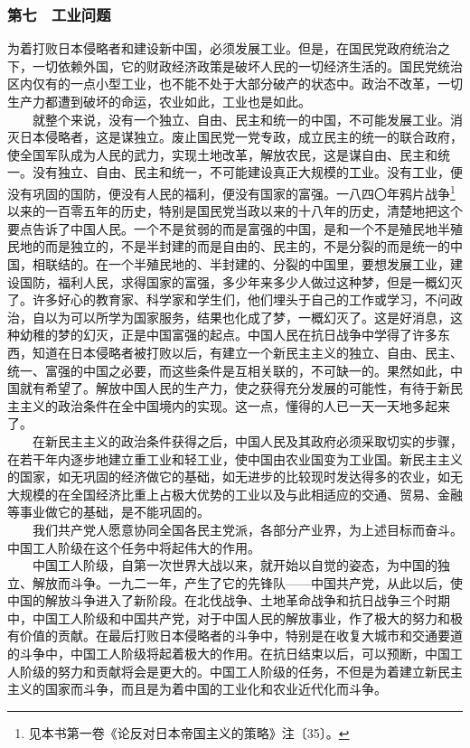 \documentclass[cn,11pt,chinese]{elegantbook}
\def\myformat#1{\hfil\hfil #1}
\begin{document}
\subsubsection*{\myformat{第七　工业问题}}
为着打败日本侵略者和建设新中国，必须发展工业。但是，在国民党政府统治之下，一切依赖外国，它的财政经济政策是破坏人民的一切经济生活的。国民党统治区内仅有的一点小型工业，也不能不处于大部分破产的状态中。政治不改革，一切生产力都遭到破坏的命运，农业如此，工业也是如此。\\
　　就整个来说，没有一个独立、自由、民主和统一的中国，不可能发展工业。消灭日本侵略者，这是谋独立。废止国民党一党专政，成立民主的统一的联合政府，使全国军队成为人民的武力，实现土地改革，解放农民，这是谋自由、民主和统一。没有独立、自由、民主和统一，不可能建设真正大规模的工业。没有工业，便没有巩固的国防，便没有人民的福利，便没有国家的富强。一八四〇年鸦片战争\footnote[21]{  见本书第一卷《论反对日本帝国主义的策略》注〔35〕。}以来的一百零五年的历史，特别是国民党当政以来的十八年的历史，清楚地把这个要点告诉了中国人民。一个不是贫弱的而是富强的中国，是和一个不是殖民地半殖民地的而是独立的，不是半封建的而是自由的、民主的，不是分裂的而是统一的中国，相联结的。在一个半殖民地的、半封建的、分裂的中国里，要想发展工业，建设国防，福利人民，求得国家的富强，多少年来多少人做过这种梦，但是一概幻灭了。许多好心的教育家、科学家和学生们，他们埋头于自己的工作或学习，不问政治，自以为可以所学为国家服务，结果也化成了梦，一概幻灭了。这是好消息，这种幼稚的梦的幻灭，正是中国富强的起点。中国人民在抗日战争中学得了许多东西，知道在日本侵略者被打败以后，有建立一个新民主主义的独立、自由、民主、统一、富强的中国之必要，而这些条件是互相关联的，不可缺一的。果然如此，中国就有希望了。解放中国人民的生产力，使之获得充分发展的可能性，有待于新民主主义的政治条件在全中国境内的实现。这一点，懂得的人已一天一天地多起来了。\\
　　在新民主主义的政治条件获得之后，中国人民及其政府必须采取切实的步骤，在若干年内逐步地建立重工业和轻工业，使中国由农业国变为工业国。新民主主义的国家，如无巩固的经济做它的基础，如无进步的比较现时发达得多的农业，如无大规模的在全国经济比重上占极大优势的工业以及与此相适应的交通、贸易、金融等事业做它的基础，是不能巩固的。\\
　　我们共产党人愿意协同全国各民主党派，各部分产业界，为上述目标而奋斗。中国工人阶级在这个任务中将起伟大的作用。\\
　　中国工人阶级，自第一次世界大战以来，就开始以自觉的姿态，为中国的独立、解放而斗争。一九二一年，产生了它的先锋队——中国共产党，从此以后，使中国的解放斗争进入了新阶段。在北伐战争、土地革命战争和抗日战争三个时期中，中国工人阶级和中国共产党，对于中国人民的解放事业，作了极大的努力和极有价值的贡献。在最后打败日本侵略者的斗争中，特别是在收复大城市和交通要道的斗争中，中国工人阶级将起着极大的作用。在抗日结束以后，可以预断，中国工人阶级的努力和贡献将会是更大的。中国工人阶级的任务，不但是为着建立新民主主义的国家而斗争，而且是为着中国的工业化和农业近代化而斗争。\\
\end{document}
